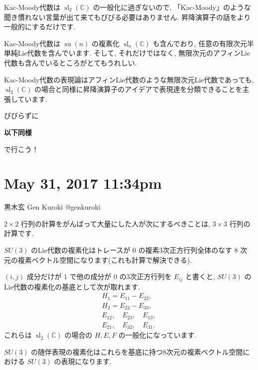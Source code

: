 \documentclass[12pt,twoside]{jarticle}
\theoremstyle{jplain}
\theoremstyle{jplain}
\theoremstyle{jplain}
\numberwithin{theorem}{section}
\numberwithin{equation}{section}
\numberwithin{figure}{section}
\numberwithin{table}{section}
\begin{document}
Kac-Moody代数は $\operatorname{sl}_2(\mathbb C)$ の一般化に過ぎないので, 「Kac-Moody」のような聞き慣れない言葉が出て来てもびびる必要はありません. 昇降演算子の話をより一般的にするだけです. 

Kac-Moody代数は $\operatorname{su}(n)$ の複素化 $\operatorname{sl}_n(\mathbb C)$ も含んでおり, 任意の有限次元半単純Lie代数を含んでいます. そして, それだけではなく, 無限次元のアフィンLie代数も含んでいるところがとてもうれしい. 

Kac-Moody代数の表現論はアフィンLie代数のような無限次元Lie代数であっても, $\operatorname{sl}_2(\mathbb C)$ の場合と同様に昇降演算子のアイデアで表現達を分類できることを主張しています. 

びびらずに\begin{center}{\Large\bfseries 以下同様}\end{center}で行こう！







\section{ May 31, 2017 11:34pm}








黒木玄 Gen Kuroki
@genkuroki


$2\times 2$ 行列の計算をがんばって大量にした人が次にするべきことは, $3\times 3$ 行列の計算です.

$SU(3)$ のLie代数の複素化はトレースが $0$ の複素3次正方行列全体のなす $8$ 次元の複素ベクトル空間になります(これも計算で解決できる). 

$(i,j)$ 成分だけが $1$ で他の成分が $0$ の3次正方行列を $E_{ij}$ と書くと, $SU(3)$ のLie代数の複素化の基底として次が取れます. \begin{align*}H_1=E_{11}-E_{22},\\ H_2=E_{22}-E_{33},\\ E_{12},\quad E_{23},\quad E_{13},\\ E_{21},\quad E_{32},\quad E_{31}.\end{align*}これらは $\operatorname{sl}_2(\mathbb C)$ の場合の $H,E,F$ の一般化になっています. 

$SU(3)$ の随伴表現の複素化はこれらを基底に持つ8次元の複素ベクトル空間における $SU(3)$ の表現になります. 
\end{document}
